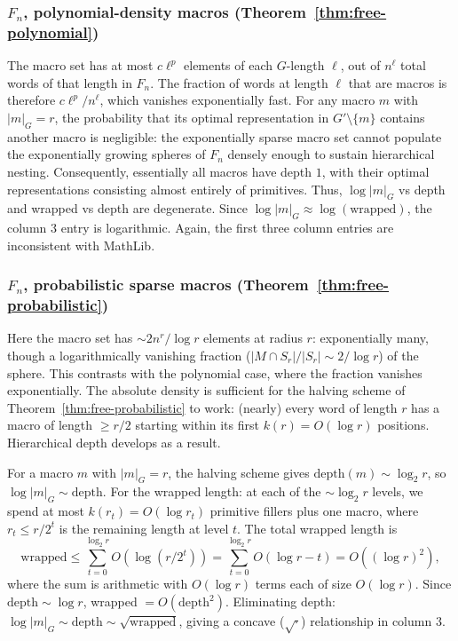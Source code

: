 \documentclass[12pt]{amsart}
\theoremstyle{definition}
\theoremstyle{remark}
\begin{document}
\subsubsection{$F_n$, polynomial-density macros 
(Theorem~\ref{thm:free-polynomial})}
The macro set has at most $c\ell^p$ elements of each $G$-length $\ell$, out of 
$n^\ell$ total words of that length in $F_n$. The fraction of words at length 
$\ell$ that are macros is therefore $c\ell^p / n^\ell$, which vanishes 
exponentially fast. For any macro $m$ with $|m|_G = r$, the probability that 
its optimal representation in $G' \setminus \{m\}$ contains another macro is 
negligible: the exponentially sparse macro set cannot populate the exponentially 
growing spheres of $F_n$ densely enough to sustain hierarchical nesting. 
Consequently, essentially all macros have depth $1$, with their optimal representations consisting almost entirely of primitives. 
Thus, $\log|m|_G$ vs depth and wrapped vs 
depth are degenerate. 
Since $\log|m|_G \approx \log(\text{wrapped})$, the column 3 entry is logarithmic. 
Again, the first three column entries are inconsistent with MathLib.

\subsubsection{$F_n$, probabilistic sparse macros 
(Theorem~\ref{thm:free-probabilistic})}
Here the macro set has $\sim 2n^r / \log r$ elements at radius $r$: exponentially many, though a logarithmically vanishing fraction ($|M \cap S_r|/|S_r| \sim 2/\log r$) of the sphere.
This contrasts with the polynomial case, where the fraction vanishes exponentially.
The absolute density is sufficient for the halving scheme of Theorem~\ref{thm:free-probabilistic} to work: (nearly) every word of length $r$ has a macro of length $\geq r/2$ starting within its first $k(r) = O(\log r)$ positions. 
Hierarchical depth develops as a result.

For a macro $m$ with $|m|_G = r$, the halving scheme gives 
$\mathrm{depth}(m) \sim \log_2 r$, so $\log|m|_G \sim \mathrm{depth}$. 
For the wrapped length: at each of the $\sim \log_2 r$ levels, we spend at most $k(r_t) = O(\log r_t)$ primitive fillers plus one macro, where $r_t \leq r/2^t$ is the remaining length at level $t$. The total wrapped length 
is
\[
\text{wrapped} \leq \sum_{t=0}^{\log_2 r} O(\log(r/2^t)) 
= \sum_{t=0}^{\log_2 r} O(\log r - t) = O((\log r)^2),
\]
where the sum is arithmetic with $O(\log r)$ terms each of size $O(\log r)$. 
Since $\mathrm{depth} \sim \log r$, wrapped $= O(\mathrm{depth}^2)$. 
Eliminating depth: $\log|m|_G \sim \mathrm{depth} \sim 
\sqrt{\text{wrapped}}$, giving a concave ($\sqrt{\cdot}$) relationship in column 3. 
\end{document}
